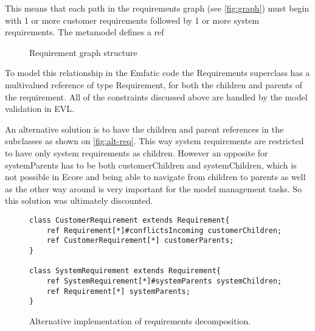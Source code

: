 \documentclass[11pt,a4paper]{article}
\begin{document}
	This means that each path in the requirements graph (see \autoref{fig:graph}) must begin with 1 or more customer requirements followed by 1 or more system requirements. The metamodel defines a ref
	
	\begin{figure}[h!]
		
		\centering
	
		
		\caption{Requirement graph structure}
		\label{fig:graph}
	\end{figure}	

	To model this relationship in the Emfatic code the Requirements superclass has a multivalued reference of type Requirement, for both the children and parents of the requirement. All of the constraints discussed above are handled by the model validation in EVL.
	
	An alternative solution is to have the children and parent references in the subclasses as shown on \autoref{fig:alt-req}. This way system requirements are restricted to have only system requirements as children. However an opposite for systemParents has to be both customerChildren and systemChildren, which is not possible in Ecore and being able to navigate from children to parents as well as the other way around is very important for the model management tasks. So this solution was ultimately discounted.
	
	\begin{figure}[h!]
	\centering
	\begin{lstlisting}
class CustomerRequirement extends Requirement{
	ref Requirement[*]#conflictsIncoming customerChildren;
	ref CustomerRequirement[*] customerParents;
}
	
class SystemRequirement extends Requirement{
	ref SystemRequirement[*]#systemParents systemChildren;
	ref Requirement[*] systemParents;
}
	\end{lstlisting}
	
	\caption{Alternative implementation of requirements decomposition.}
	\label{fig:alt-req}
	
	\end{figure}
	
\end{document}
